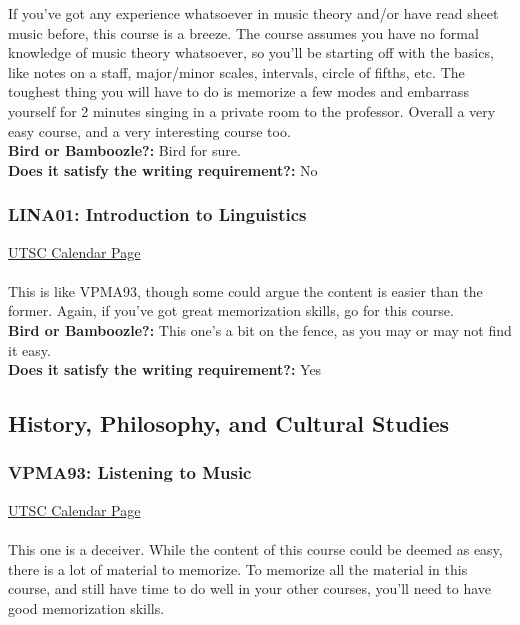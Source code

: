 \documentclass[11pt]{article}
\begin{document}
If you've got any experience whatsoever in music theory and/or have read sheet music before, this course is a breeze.  The course assumes you have no formal knowledge of music theory whatsoever, so you'll be starting off with the basics, like notes on a staff, major/minor scales, intervals, circle of fifths, etc.  The toughest thing you will have to do is memorize a few modes and embarrass yourself for 2 minutes singing in a private room to the professor. Overall a very easy course, and a very interesting course too.\\

\textbf{Bird or Bamboozle?:} Bird for sure.\\

\textbf{Does it satisfy the writing requirement?:} No

\subsubsection{LINA01: Introduction to Linguistics}

\href{https://utsc.calendar.utoronto.ca/course/LINA01H3}{UTSC Calendar Page}\\\\
This is like VPMA93, though some could argue the content is easier than the former.  Again, if you've got great memorization skills, go for this course. \\

\textbf{Bird or Bamboozle?:} This one's a bit on the fence, as you may or may not find it easy.\\

\textbf{Does it satisfy the writing requirement?:} Yes

\subsection{History, Philosophy, and Cultural Studies}
\subsubsection{VPMA93: Listening to Music}

\href{https://utsc.calendar.utoronto.ca/course/VPMA93H3}{UTSC Calendar Page}\\\\
This one is a deceiver.  While the content of this course could be deemed as easy, there is a lot of material to memorize.  To memorize all the material in this course, and still have time to do well in your other courses, you'll need to have good memorization skills.\\
\end{document}
